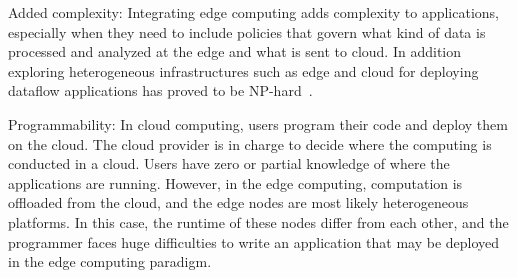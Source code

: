 Added complexity: Integrating edge computing adds complexity to applications, especially when they need to include policies that govern what kind of data is processed and analyzed at the edge and what is sent to cloud. In addition exploring heterogeneous infrastructures such as edge and cloud for deploying dataflow applications has proved to be NP-hard~\cite{Benoit:2013}.

Programmability: In cloud computing, users program their code and deploy them on the cloud. The cloud provider is in charge to decide where the computing is conducted in a cloud. Users have zero or partial knowledge of where the applications are running. However, in the edge computing, computation is offloaded from the cloud, and the edge nodes are most likely heterogeneous platforms. In this case, the runtime of these nodes differ from each other, and the programmer faces huge difficulties to write an application that may be deployed in the edge computing paradigm.

